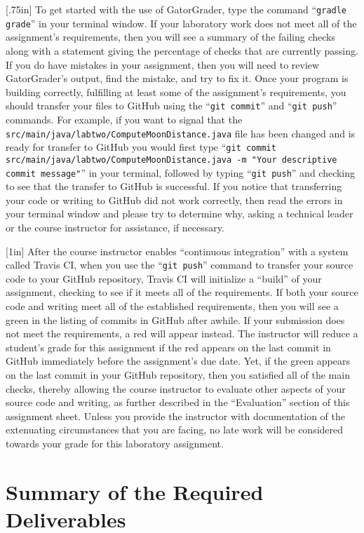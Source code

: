 \documentclass[11pt]{article}
\newcommand{\mainprogramsource}{\lstinline{src/main/java/labtwo/ComputeMoonDistance.java}}
\newcommand{\gatorgraderstart}{\command{gradle grade}}
\newcommand{\gitcommit}{\command{git commit}}
\newcommand{\gitpush}{\command{git push}}
\newcommand{\gitcommitmainprogram}{\command{git commit src/main/java/labtwo/ComputeMoonDistance.java -m "Your
descriptive commit message"}}
\newcommand{\command}[1]{``\lstinline{#1}''}
\newcommand{\step}[1]{``{#1}''}
\newcommand{\checkmark}{\ding{51}}
\newcommand{\naughtmark}{\ding{55}}
\newcommand{\caution}[1]{\null\hfill\LARGE{\faWarning{}}\newline\scriptsize{\em{#1}}}
\begin{document}
\marginnote{\caution{Write useful commits}}[.75in] To get started with the use
of GatorGrader, type the command \gatorgraderstart{} in your terminal window.
If your laboratory work does not meet all of the assignment's requirements,
then you will see a summary of the failing checks along with a statement giving
the percentage of checks that are currently passing. If you do have mistakes in
your assignment, then you will need to review GatorGrader's output, find the
mistake, and try to fix it. Once your program is building correctly, fulfilling
at least some of the assignment's requirements, you should transfer your files
to GitHub using the \gitcommit{} and \gitpush{} commands. For example, if you
want to signal that the \mainprogramsource{} file has been changed and is ready
for transfer to GitHub you would first type \gitcommitmainprogram{} in your
terminal, followed by typing \gitpush{} and checking to see that the transfer
to GitHub is successful. If you notice that transferring your code or writing
to GitHub did not work correctly, then read the errors in your terminal window
and please try to determine why, asking a technical leader or the course
instructor for assistance, if necessary.

\marginnote{\caution{Verify all checks}}[1in] After the course instructor
enables \step{continuous integration} with a system called Travis CI, when you
use the \gitpush{} command to transfer your source code to your GitHub
repository, Travis CI will initialize a \step{build} of your assignment,
checking to see if it meets all of the requirements. If both your source code
and writing meet all of the established requirements, then you will see a green
\checkmark{} in the listing of commits in GitHub after awhile. If your
submission does not meet the requirements, a red \naughtmark{} will appear
instead. The instructor will reduce a student's grade for this assignment if the
red \naughtmark{} appears on the last commit in GitHub immediately before the
assignment's due date. Yet, if the green \checkmark{} appears on the last commit
in your GitHub repository, then you satisfied all of the main checks, thereby
allowing the course instructor to evaluate other aspects of your source code and
writing, as further described in the \step{Evaluation} section of this
assignment sheet. Unless you provide the instructor with documentation of the
extenuating circumstances that you are facing, no late work will be considered
towards your grade for this laboratory assignment.

\section*{Summary of the Required Deliverables}
\end{document}
